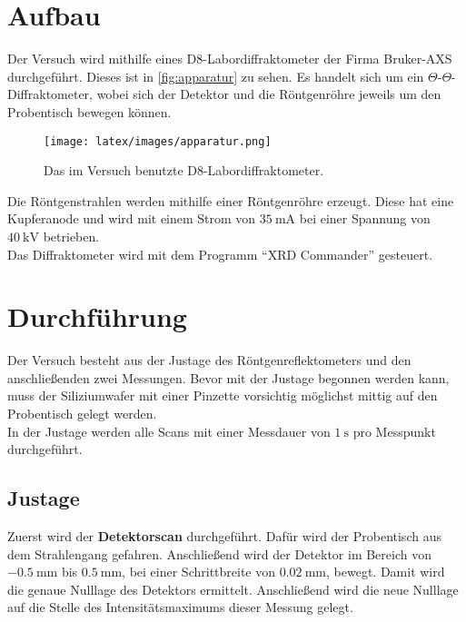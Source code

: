 \section{Aufbau}

    \noindent Der Versuch wird mithilfe eines D8-Labordiffraktometer der Firma Bruker-AXS durchgeführt. Dieses ist in \autoref{fig:apparatur}
    zu sehen. Es handelt sich um ein $\Theta$-$\Theta$-Diffraktometer, wobei sich der Detektor und die Röntgenröhre jeweils um den 
    Probentisch bewegen können. 
    \begin{figure}
        \centering
        \texttt{[image: latex/images/apparatur.png]}
        \caption{Das im Versuch benutzte D8-Labordiffraktometer. \cite{katti} }
        \label{fig:apparatur}
    \end{figure}
    Die Röntgenstrahlen werden mithilfe einer Röntgenröhre erzeugt. Diese hat eine Kupferanode und wird mit einem Strom von $\SI{35}{\milli\ampere}$ 
    bei einer Spannung von $\SI{40}{\kilo\volt}$ betrieben. \\
    Das Diffraktometer wird mit dem Programm \enquote{XRD Commander} gesteuert. 

\section{Durchführung}

    \noindent 
    Der Versuch besteht aus der  Justage des Röntgenreflektometers und den anschließenden zwei Messungen.
    Bevor mit der Justage begonnen werden kann, muss der Siliziumwafer mit einer Pinzette vorsichtig möglichst mittig auf den Probentisch gelegt werden. \\
    In der Justage werden alle Scans mit einer Messdauer von $\SI{1}{\second}$ pro Messpunkt durchgeführt.


    \subsection{Justage}

        \noindent Zuerst wird der \textbf{Detektorscan} durchgeführt. Dafür wird der Probentisch aus dem Strahlengang gefahren. Anschließend 
        wird der Detektor im Bereich von $\SI{-0.5}{\milli\metre}$ bis $\SI{0.5}{\milli\metre}$, bei einer Schrittbreite von $\SI{0.02}{\milli\metre} $, bewegt. 
        Damit wird die genaue Nulllage des Detektors ermittelt. Anschließend wird die neue Nulllage auf die Stelle des Intensitätsmaximums 
        dieser Messung gelegt. \\

